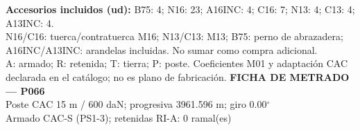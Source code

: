 \begingroup\scriptsize
\textbf{Accesorios incluidos (ud):} B75: 4; N16: 23; A16INC: 4; C16: 7; N13: 4; C13: 4; A13INC: 4.\\
N16/C16: tuerca/contratuerca M16; N13/C13: M13; B75: perno de abrazadera; A16INC/A13INC: arandelas incluidas. No sumar como compra adicional.\\
A: armado; R: retenida; T: tierra; P: poste. Coeficientes M01 y adaptación CAC declarada en el catálogo; no es plano de fabricación.
\endgroup\endgroup
\clearpage{}
\begingroup\small\setlength{\parskip}{3pt}\renewcommand{\arraystretch}{1.05}
\textbf{\large FICHA DE METRADO — P066}\\[4pt]
Poste CAC 15 m / 600 daN; progresiva 3961.596 m; giro 0.00\ensuremath{^\circ}\\
Armado CAC-S (PS1-3); retenidas RI-A: 0 ramal(es)\\
\begingroup\scriptsize
